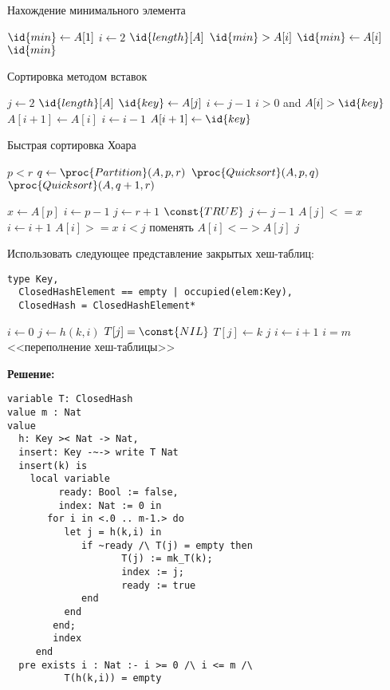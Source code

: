 

\z Нахождение минимального элемента
\begin{codebox}
\li $\id{min} \gets A[1]$
\li \For $i \gets 2$ \To $\id{length}[A]$
\li \Do \If $\id{min} > A[i]$
\li \Then $\id{min} \gets A[i]$ \End \End
\li \Return $\id{min}$
\end{codebox}

\z Сортировка методом вставок
\begin{codebox}
\li \For $j \gets 2$ \To $\id{length}[A]$
\li \Do $\id{key} \gets A[j]$
\li $i \gets j-1$
\li \While $i > 0$ and $A[i] > \id{key}$
\li \Do $A[i+1] \gets A[i]$
\li $i \gets i-1$ \End
\li $A[i+1] \gets \id{key}$ \End
\end{codebox}

\z Быстрая сортировка Хоара
\begin{codebox}
\li \If $p < r$
\li \Then $q \gets \proc{Partition}(A, p, r)$
\li $\proc{Quicksort}(A, p, q)$
\li $\proc{Quicksort}(A, q+1, r)$ \End
\end{codebox}

\begin{codebox}
\li $x \gets A[p]$
\li $i \gets p-1$
\li $j \gets r+1$
\li \While $\const{TRUE}$
\li \Do \Repeat $j \gets j-1$
\li \Until $A[j] <= x$
\li \Repeat $i \gets i+1$
\li \Until $A[i] >= x$
\li \If $i < j$
\li \Then $\mbox{поменять~} A[i] <-> A[j]$
\li \Else \Return $j$ \End \End
\end{codebox}

\z Использовать следующее представление закрытых хеш-таблиц:
\begin{lstlisting}
type Key,
  ClosedHashElement == empty | occupied(elem:Key),
  ClosedHash = ClosedHashElement*
\end{lstlisting}

\begin{codebox}
\li $i \gets 0$
\li \Repeat $j \gets h(k,i)$
\li \If $T[j] = \const{NIL}$
\li \Then $T[j] \gets k$
\li \Return $j$
\li \Else $i \gets i+1$ \End
\li \Until $i = m$ \End
\li \Error <<переполнение хеш-таблицы>>
\end{codebox}

\textbf{Решение:}
\begin{lstlisting}
variable T: ClosedHash
value m : Nat
value
  h: Key >< Nat -> Nat,
  insert: Key -~-> write T Nat
  insert(k) is
    local variable
         ready: Bool := false,
         index: Nat := 0 in
       for i in <.0 .. m-1.> do
          let j = h(k,i) in
             if ~ready /\ T(j) = empty then
                    T(j) := mk_T(k);
                    index := j;
                    ready := true
             end
          end
        end;
        index
     end
  pre exists i : Nat :- i >= 0 /\ i <= m /\ 
          T(h(k,i)) = empty
\end{lstlisting}

